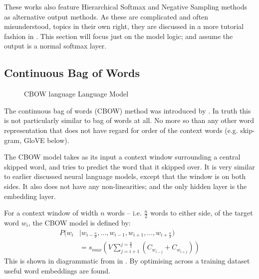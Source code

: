\documentclass[parskip]{komatufte}
\begin{document}



These works also feature Hierarchical Softmax and Negative Sampling methods as alternative output methods.
As these are complicated and often misunderstood, topics in their own right, they are discussed in a more tutorial fashion in .
This section will focus just on the model logic; and assume the output is a normal softmax layer.

\subsection{Continuous Bag of Words}\label{sec:cbow}
\begin{figure}
	\caption{CBOW language Language Model}
	\label{fig:cbow}
	\centering
	 
\end{figure}

The continuous bag of words (CBOW) method was introduced by .
In truth this is not particularly similar to bag of words at all.
No more so than any other word representation that does not have regard for order of the context words (e.g. skip-gram, GloVE below).

The CBOW model takes as its input a context window surrounding a central skipped word, and tries to predict the word that it skipped over.
It is very similar to earlier discussed neural language models, except that the window is on both sides.
It also does not have any non-linearities;
and the only hidden layer is the embedding layer.

For a context window of width $n$ words -- i.e. $\frac{n}{2}$ words to either side, of the target word $w_i$,
the CBOW model is defined by:
\begin{align}
P(w_i & \mid w_{i-\frac{n}{2}},..., w_{i-1}, w_{i+1},...,w_{i+\frac{n}{2}})  \nonumber
\\  & = s_{max}(V \sum_{j=i+1}^{j=\frac{n}{2}} \left( C_{w_{i-j}}+C_{w_{i+j}} \right))
\end{align}
This is shown in diagrammatic from in .
By optimising across a training dataset
useful word embeddings are found.
\end{document}
